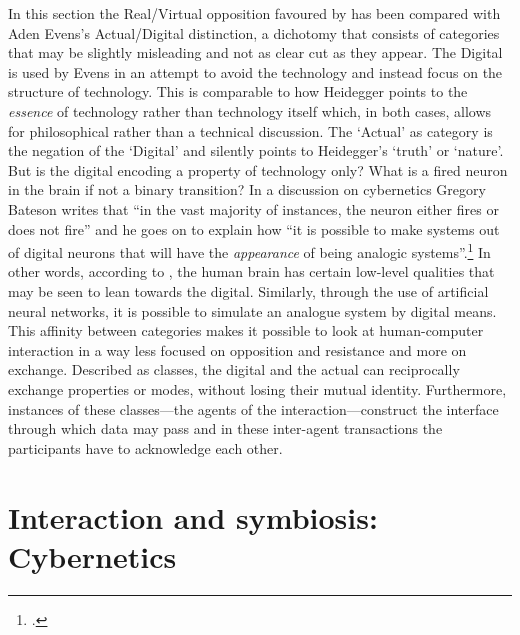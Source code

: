 \label{sec:interaction-digital-4}
In this section the Real/Virtual opposition favoured by \citeauthor{baudrillard02} has been compared with Aden Evens's Actual/Digital distinction, a dichotomy that consists of categories that may be slightly misleading and not as clear cut as they appear. The Digital is used by Evens in an attempt to avoid the technology and instead focus on the structure of technology. This is comparable to how Heidegger points to the \emph{essence} of technology rather than technology itself which, in both cases, allows for philosophical rather than a technical discussion. The `Actual' as category is the negation of the `Digital' and silently points to Heidegger's `truth' or `nature'. But is the digital encoding a property of technology only? What is a fired neuron in the brain if not a binary transition? In a discussion on cybernetics Gregory Bateson writes that ``in the vast majority of instances, the neuron either fires or does not fire'' and he goes on to explain how ``it is possible to make systems out of digital neurons that will have the \emph{appearance} of being analogic systems''.\footcite[103]{Bateson} In other words, according to \citeauthor{Bateson}, the human brain has certain low-level qualities that may be seen to lean towards the digital. Similarly, through the use of artificial neural networks, it is possible to simulate an analogue system by digital means. This affinity between categories makes it possible to look at human-computer interaction in a way less focused on opposition and resistance and more on exchange. Described as classes, the digital and the actual can reciprocally exchange properties or modes, without losing their mutual identity. Furthermore, instances of these classes---the agents of the interaction---construct the interface through which data may pass and in these inter-agent transactions the participants have to acknowledge each other.


\section{Interaction and symbiosis: Cybernetics}
\label{sec:interaction-symbiosis}

